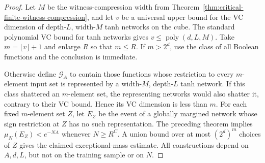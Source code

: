 \begin{proof}
Let $M$ be the witness-compression width from
Theorem~\ref{thm:critical-finite-witness-compression}, and let $v$ be
a universal upper bound for the VC dimension of depth-$L$, width-$M$
tanh networks on the cube. The standard polynomial VC bound for tanh
networks gives $v\le\operatorname{poly}(d,L,M)$.
Take $m=\lfloor v\rfloor+1$ and enlarge $R$ so that $m\le R$.
If $m>2^d$, use the class of all Boolean functions and the conclusion
is immediate.

Otherwise define $\mathcal G_A$ to contain those functions whose
restriction to every $m$-element input set is represented by a
width-$M$, depth-$L$ tanh network. If this class shattered an
$m$-element set, the representing networks would also shatter it,
contrary to their VC bound. Hence its VC dimension is less than $m$.
For each fixed $m$-element set $Z$, let $E_Z$ be the event of a
globally margined network whose sign restriction at $Z$ has no such
representation. The preceding theorem implies $\mu_N(E_Z)<e^{-NA}$
whenever $N\ge R^C$. A union bound over at most $(2^d)^m$ choices
of $Z$ gives the claimed exceptional-mass estimate. All constructions
depend on $A,d,L$, but not on the training sample or on $N$.
\end{proof}
